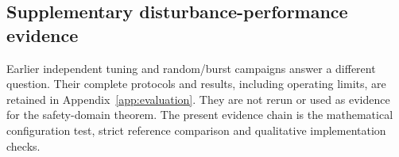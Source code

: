 \subsection{Supplementary disturbance-performance evidence}
Earlier independent tuning and random/burst campaigns answer a
different question. Their complete protocols and results, including
operating limits, are retained in Appendix~\ref{app:evaluation}.
They are not rerun or used as evidence for the safety-domain theorem.
The present evidence chain is the mathematical configuration test,
strict reference comparison and qualitative implementation checks.
